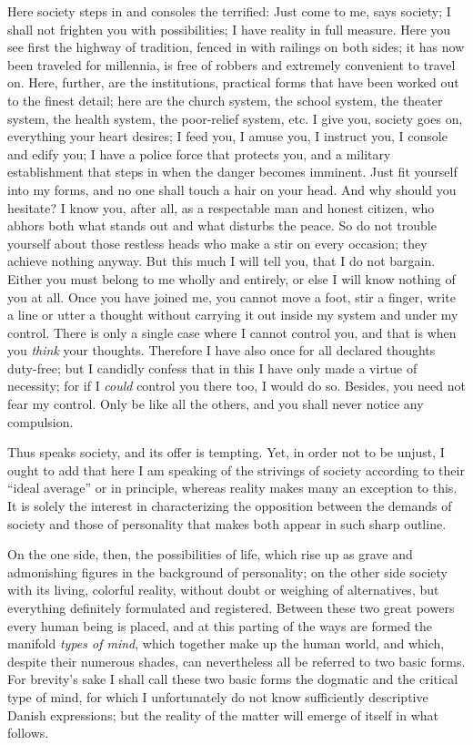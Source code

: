 \documentclass[12pt,a4paper,openany]{book}
\newcommand{\opage}[1]{\marginnote{\footnotesize\textit{[#1]}}}
\begin{document}
Here society steps in and consoles the terrified: Just come to me, says society; I shall
not frighten you with possibilities; I have reality in full measure. Here you see first
the highway of tradition, fenced in with railings on both sides; it has now been traveled
for millennia, is free of robbers and extremely convenient to travel on. Here, further,
are the institutions, practical forms that have been worked out to the finest detail;
here are the church system, the school system, the theater system, the health system, the
poor-relief system, etc. I give you, society goes on, everything your heart desires; I
feed you, I amuse you, I instruct you, I console and edify you; I have a police force
that protects you, and a military establishment that steps in when the danger
\setcounter{footnote}{0}%
\opage{224}becomes imminent. Just fit yourself into my forms, and no one shall touch a
hair on your head. And why should you hesitate? I know you, after all, as a respectable
man and honest citizen, who abhors both what stands out and what disturbs the peace. So
do not trouble yourself about those restless heads who make a stir on every occasion;
they achieve nothing anyway. But this much I will tell you, that I do not bargain. Either
you must belong to me wholly and entirely, or else I will know nothing of you at all.
Once you have joined me, you cannot move a foot, stir a finger, write a line or utter a
thought without carrying it out inside my system and under my control. There is only a
single case where I cannot control you, and that is when you \emph{think} your thoughts.
Therefore I have also once for all declared thoughts duty-free; but I candidly confess
that in this I have only made a virtue of necessity; for if I \emph{could} control you
there too, I would do so. Besides, you need not fear my control. Only be like all the
others, and you shall never notice any compulsion.

Thus speaks society, and its offer is tempting. Yet, in order not to be unjust, I ought
to add that here I am speaking of the strivings of society according to their ``ideal
average'' or in principle, whereas reality makes many an exception to this. It is solely
the interest in characterizing the opposition between the demands of society and those of
personality that makes both appear in such sharp outline.

On the one side, then, the possibilities of life, which rise up as grave and admonishing
figures in the background of personality; on the other side society with its living,
colorful reality, without doubt or weighing of alternatives, but everything definitely
formulated and registered. Between these two great powers every human being is placed,
and at this parting of the ways are formed the manifold \emph{types of mind}, which
together make up
\setcounter{footnote}{0}%
\opage{225}the human world, and which, despite their numerous shades, can nevertheless
all be referred to two basic forms. For brevity's sake I shall call these two basic
forms the dogmatic and the critical type of mind, for which I unfortunately do not know
sufficiently descriptive Danish expressions; but the reality of the matter will emerge of
itself in what follows.
\end{document}
